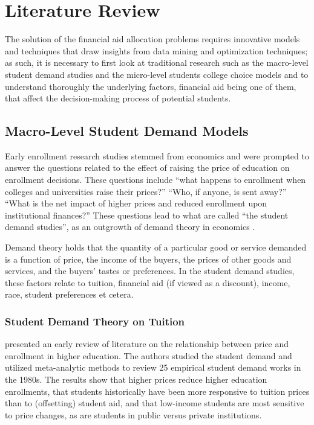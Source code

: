 \documentclass[12pt,english]{report}
\begin{document}
\chapter{Literature Review}
The solution of the financial aid allocation problems requires innovative models and techniques that draw insights from data mining and optimization techniques; as such, it is necessary to first look at traditional research such as the macro-level student demand studies and the micro-level students college choice models and to understand  thoroughly the underlying factors, financial aid being one of them, that affect the decision-making process of potential students.

\section{Macro-Level Student Demand Models}
Early enrollment research studies stemmed from economics and were prompted to answer the questions related to the effect of raising the price of education on enrollment decisions. These questions include  ``what happens to enrollment when colleges and universities raise their prices?''  ``Who, if anyone, is sent away?''  ``What is the net impact of higher prices and reduced enrollment upon institutional finances?''  These questions  lead to what are called ``the student demand studies'', as an outgrowth of demand theory in economics \citep{Leslie1987,  Leslie1988, Heller1997, Ehrenberg2004, Crouse2015}.

Demand theory holds that the quantity of a particular good or service demanded is a function of price, the income of the buyers, the prices of other goods and services, and the buyers' tastes or preferences. In the student demand studies, these factors relate to tuition, financial aid (if viewed as a discount), income, race, student preferences et cetera.

\subsection{Student Demand Theory on Tuition}
\citet{Leslie1987} presented an early review of literature on the relationship between price and enrollment in higher education. The authors studied the student demand and utilized meta-analytic methods to review 25 empirical student demand works in the 1980s. The results show that higher prices reduce higher education enrollments, that students historically have been more responsive to tuition prices than to (offsetting) student aid, and that low-income students are most sensitive to price changes, as are students in public versus private institutions.
\end{document}

